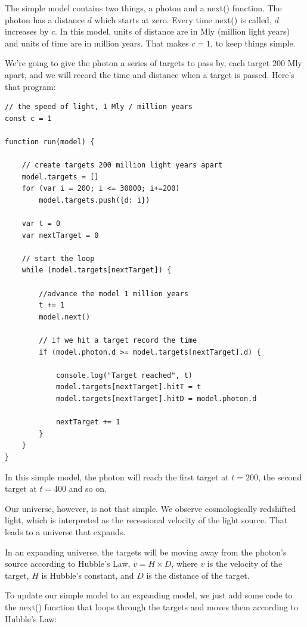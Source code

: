 \documentclass{ws-mpla}
\begin{document}
The simple model contains two things, a photon and a next() function. The photon has a distance $d$ which starts at zero. 
Every time next() is called, $d$ increases by $c$. In this model, units of distance are in Mly (million light years) and units of time are in million years. 
That makes $c = 1$, to keep things simple.

We're going to give the photon a series of targets to pass by, each target 200 Mly apart, and we will record the time and distance when a target is passed. Here's that program:

\begin{verbatim}
// the speed of light, 1 Mly / million years
const c = 1

function run(model) {

    // create targets 200 million light years apart
    model.targets = []
    for (var i = 200; i <= 30000; i+=200) 
        model.targets.push({d: i})

    var t = 0
    var nextTarget = 0

    // start the loop
    while (model.targets[nextTarget]) {

        //advance the model 1 million years
        t += 1
        model.next()

        // if we hit a target record the time
        if (model.photon.d >= model.targets[nextTarget].d) {
            
            console.log("Target reached", t)
            model.targets[nextTarget].hitT = t
            model.targets[nextTarget].hitD = model.photon.d

            nextTarget += 1
        }
    }
}
\end{verbatim}

In this simple model, the photon will reach the first target at $t=200$, the second target at $t=400$ and so on.

Our universe, however, is not that simple. We observe cosmologically redshifted light, 
which is interpreted as the recessional velocity of the light source. That leads to a universe that expands.

In an expanding universe, the targets will be moving away from the photon's source according to Hubble's Law, $v = H \times D$, 
where $v$ is the velocity of the target, $H$ is Hubble's constant, and $D$ is the distance of the target.

To update our simple model to an expanding model, we just add some code to the next() function that loops through the targets and moves them 
according to Hubble's Law:
\end{document}
